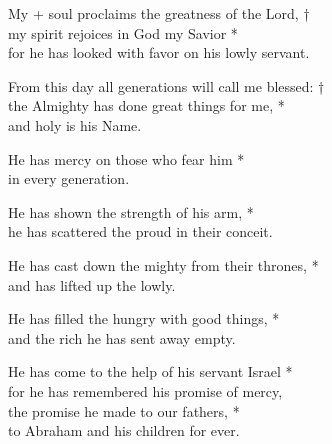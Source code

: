 
My + soul proclaims the greatness of the Lord, †\\
my spirit rejoices in God my Savior *\\
for he has looked with favor on his lowly servant.

From this day all generations will call me blessed: †\\
the Almighty has done great things for me, *\\
and holy is his Name.

He has mercy on those who fear him *\\
in every generation.

He has shown the strength of his arm, *\\
he has scattered the proud in their conceit.

He has cast down the mighty from their thrones, *\\
and has lifted up the lowly.

He has filled the hungry with good things, *\\
and the rich he has sent away empty.

He has come to the help of his servant Israel *\\
for he has remembered his promise of mercy,\\
the promise he made to our fathers, *\\
to Abraham and his children for ever.

